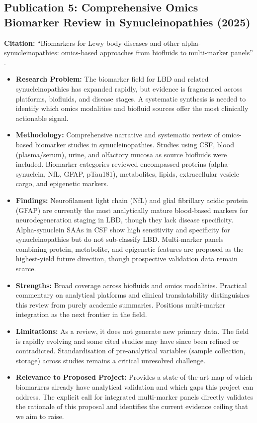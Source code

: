 \subsection{Publication 5: Comprehensive Omics Biomarker Review in Synucleinopathies (2025)}
\textbf{Citation:} ``Biomarkers for Lewy body diseases and other alpha-synucleinopathies: omics-based approaches from biofluids to multi-marker panels'' \cite{boiten2025biomarkers}.

\begin{itemize}
    \item \textbf{Research Problem:} The biomarker field for LBD and related synucleinopathies has expanded rapidly, but evidence is fragmented across platforms, biofluids, and disease stages. A systematic synthesis is needed to identify which omics modalities and biofluid sources offer the most clinically actionable signal.
    \item \textbf{Methodology:} Comprehensive narrative and systematic review of omics-based biomarker studies in synucleinopathies. Studies using CSF, blood (plasma/serum), urine, and olfactory mucosa as source biofluids were included. Biomarker categories reviewed encompassed proteins (alpha-synuclein, NfL, GFAP, pTau181), metabolites, lipids, extracellular vesicle cargo, and epigenetic markers.
    \item \textbf{Findings:} Neurofilament light chain (NfL) and glial fibrillary acidic protein (GFAP) are currently the most analytically mature blood-based markers for neurodegeneration staging in LBD, though they lack disease specificity. Alpha-synuclein SAAs in CSF show high sensitivity and specificity for synucleinopathies but do not sub-classify LBD. Multi-marker panels combining protein, metabolite, and epigenetic features are proposed as the highest-yield future direction, though prospective validation data remain scarce.
    \item \textbf{Strengths:} Broad coverage across biofluids and omics modalities. Practical commentary on analytical platforms and clinical translatability distinguishes this review from purely academic summaries. Positions multi-marker integration as the next frontier in the field.
    \item \textbf{Limitations:} As a review, it does not generate new primary data. The field is rapidly evolving and some cited studies may have since been refined or contradicted. Standardisation of pre-analytical variables (sample collection, storage) across studies remains a critical unresolved challenge.
    \item \textbf{Relevance to Proposed Project:} Provides a state-of-the-art map of which biomarkers already have analytical validation and which gaps this project can address. The explicit call for integrated multi-marker panels directly validates the rationale of this proposal and identifies the current evidence ceiling that we aim to raise.
\end{itemize}

